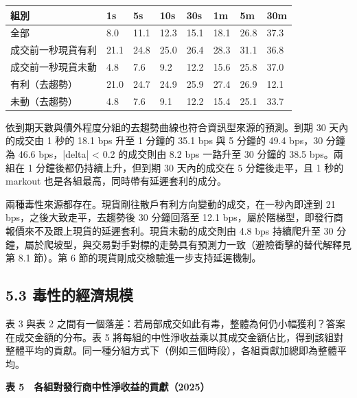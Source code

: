 \documentclass[12pt,a4paper]{article}
\begin{document}
\begin{center}\small
\begin{tabularx}{\linewidth}{Ylllllll}
\toprule
\textbf{組別} & \textbf{1s} & \textbf{5s} & \textbf{10s} & \textbf{30s} & \textbf{1m} & \textbf{5m} & \textbf{30m} \\
\midrule
全部 & 8.0 & 11.1 & 12.3 & 15.1 & 18.1 & 26.8 & 37.3 \\
成交前一秒現貨有利 & 21.1 & 24.8 & 25.0 & 26.4 & 28.3 & 31.1 & 36.8 \\
成交前一秒現貨未動 & 4.8 & 7.6 & 9.2 & 12.2 & 15.6 & 25.8 & 37.0 \\
有利（去趨勢） & 21.0 & 24.7 & 24.9 & 25.9 & 27.4 & 26.9 & 12.1 \\
未動（去趨勢） & 4.8 & 7.6 & 9.1 & 12.2 & 15.4 & 25.1 & 33.7 \\
\bottomrule
\end{tabularx}
\end{center}

依到期天數與價外程度分組的去趨勢曲線也符合資訊型來源的預測。到期 30 天內的成交由 1 秒的 18.1 bps 升至 1 分鐘的 35.1 bps 與 5 分鐘的 49.4 bps，30 分鐘為 46.6 bps，|delta| < 0.2 的成交則由 8.2 bps 一路升至 30 分鐘的 38.5 bps。兩組在 1 分鐘後都仍持續上升，但到期 30 天內的成交在 5 分鐘後走平，且 1 秒的 markout 也是各組最高，同時帶有延遲套利的成分。

兩種毒性來源都存在。現貨剛往散戶有利方向變動的成交，在一秒內即達到 21 bps，之後大致走平，去趨勢後 30 分鐘回落至 12.1 bps，屬於階梯型，即發行商報價來不及跟上現貨的延遲套利。現貨未動的成交則由 4.8 bps 持續爬升至 30 分鐘，屬於爬坡型，與交易對手對標的走勢具有預測力一致（避險衝擊的替代解釋見第 8.1 節）。第 6 節的現貨剛成交檢驗進一步支持延遲機制。

\subsection*{5.3 毒性的經濟規模}

表 3 與表 2 之間有一個落差：若局部成交如此有毒，整體為何仍小幅獲利？答案在成交金額的分布。表 5 將每組的中性淨收益乘以其成交金額佔比，得到該組對整體平均的貢獻。同一種分組方式下（例如三個時段），各組貢獻加總即為整體平均。

\begin{center}\textbf{表 5　各組對發行商中性淨收益的貢獻（2025）}\end{center}\vspace{-0.8em}
\end{document}
